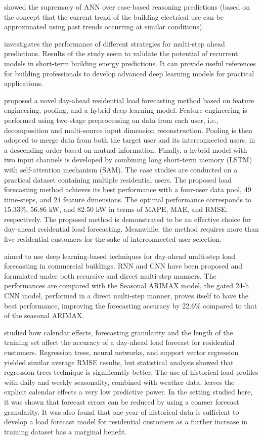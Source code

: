 \cite{PLATON201510} showed the supremacy of ANN over case-based reasoning predictions (based on the concept that the current trend of the building electrical use can be approximated using past trends occurring at similar conditions).

\cite{FAN2019700} investigates the performance of different strategies for multi-step ahead predictions.
Results of the study seem to validate the potential of recurrent models in short-term building energy predictions.
It can provide useful references for building professionals to develop advanced deep learning models for practical applications.

\cite{ZANG2021120682} proposed a novel day-ahead residential load forecasting method based on feature engineering, pooling, and a hybrid deep learning model.
Feature engineering is performed using two-stage preprocessing on data from each user, i.e., decomposition and multi-source input dimension reconstruction.
Pooling is then adopted to merge data from both the target user and its interconnected users, in a descending order based on mutual information.
Finally, a hybrid model with two input channels is developed by combining long short-term memory (LSTM) with self-attention mechanism (SAM).
The case studies are conducted on a practical dataset containing multiple residential users.
The proposed load forecasting method achieves its best performance with a four-user data pool, 49 time-steps, and 24 feature dimensions.
The optimal performance corresponds to 15.33\%, 56.86 kW, and 82.50 kW in terms of MAPE, MAE, and RMSE, respectively.
The proposed method is demonstrated to be an effective choice for day-ahead residential load forecasting. Meanwhile, the method requires more than five residential customers for the sake of interconnected user selection.

\cite{CAI20191078} aimed to use deep learning-based techniques for day-ahead multi-step load forecasting in commercial buildings.
RNN and CNN have been proposed and formulated under both recursive and direct multi-step manners.
The performances are compared with the Seasonal ARIMAX model, the gated 24-h CNN model, performed in a direct multi-step manner, proves itself to have the best performance, improving the forecasting accuracy by 22.6\% compared to that of the seasonal ARIMAX.

\cite{LUSIS2017654} studied how calendar effects, forecasting granularity and the length of the training set affect the accuracy of a day-ahead load forecast for residential customers.
Regression trees, neural networks, and support vector regression yielded similar average RMSE results, but statistical analysis showed that regression trees technique is significantly better.
The use of historical load profiles with daily and weekly seasonality, combined with weather data, leaves the explicit calendar effects a very low predictive power.
In the setting studied here, it was shown that forecast errors can be reduced by using a coarser forecast granularity.
It was also found that one year of historical data is sufficient to develop a load forecast model for residential customers as a further increase in training dataset has a marginal benefit.

